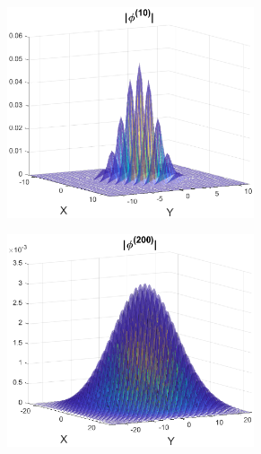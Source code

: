 \documentclass{beamer}
\theoremstyle{definition}
\begin{document}
\begin{frame}
\begin{figure}
\begin{subfigure}{0.49\textwidth}
		\includegraphics[width=0.8\textwidth]{convolve_11.eps}
	\end{subfigure}
	\begin{subfigure}{0.49\textwidth}
		\centering
		\includegraphics[width=0.8\textwidth]{convolve_22.eps}
	\end{subfigure}
\end{figure}
\end{frame}
\end{document}
